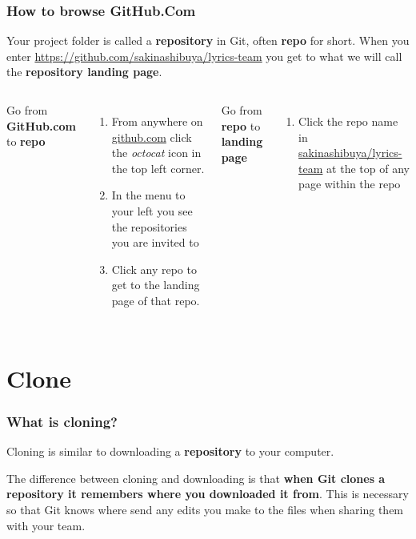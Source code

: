 \documentclass[aspectratio=169]{beamer} %
\newcommand{\trainingURL}[1]{{\color{blue}\url{#1}}}
\newcommand{\traininerUsername}{sakinashibuya}
\newcommand{\repoName}{\traininerUsername/lyrics-team}
\newcommand{\trainingRepoURL}[1]{\trainingURL{https://github.com/\repoName #1}}
\begin{document}
\begin{frame}
\frametitle{How to browse GitHub.Com}

	Your project folder is called a \textbf{repository} in Git, often \textbf{repo} for short.
	When you enter \trainingRepoURL{} you get to what we will call the \textbf{repository landing page}.

	\vspace{.5cm}

	\begin{columns}[T]

		Go from \textbf{GitHub.com} to \textbf{repo}
		\begin{enumerate}
			\item From anywhere on \trainingURL{github.com} click the \textit{octocat} icon in the top left corner.
			\item In the menu to your left you see the repositories you are invited to
			\item Click any repo to get to the landing page of that repo.
		\end{enumerate}

		Go from \textbf{repo} to \textbf{landing page}
		\begin{enumerate}
			\item Click the repo name in {\color{blue}\url{\repoName}} at the top of any page within the repo
		\end{enumerate}

	\end{columns}
\end{frame}

\section{Clone}

\begin{frame}
\frametitle{What is cloning?}

	Cloning is similar to downloading a \textbf{repository} to your computer.

	\vspace{.5cm}

	The difference between cloning and downloading is that \textbf{when Git clones a repository it remembers where you downloaded it from}. This is necessary so that Git knows where send any edits you make to the files when sharing them with your team.

\end{frame}
\end{document}
